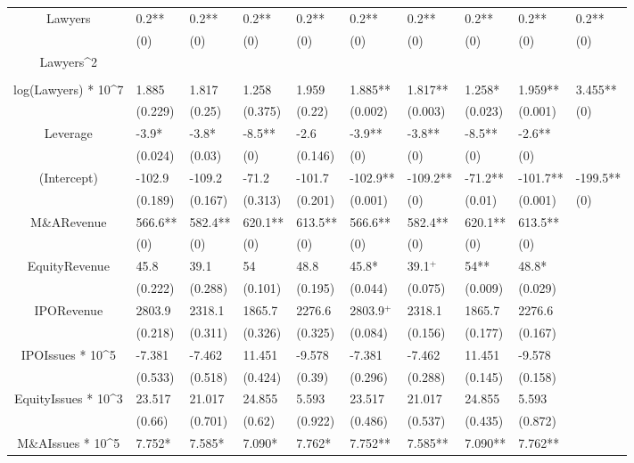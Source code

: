 \documentclass{article}
\begin{document}
\begin{table}[H]
\begin{tabular}{|clllllllll|}
Lawyers & 0.2** & 0.2** & 0.2** & 0.2** & 0.2** & 0.2** & 0.2** & 0.2** & 0.2** \\ 
   & (0) & (0) & (0) & (0) & (0) & (0) & (0) & (0) & (0) \\ 
  Lawyers^2 &  &  &  &  &  &  &  &  &  \\ 
   &  &  &  &  &  &  &  &  &  \\ 
  log(Lawyers) * 10^7 & 1.885 & 1.817 & 1.258 & 1.959 & 1.885** & 1.817** & 1.258* & 1.959** & 3.455** \\ 
   & (0.229) & (0.25) & (0.375) & (0.22) & (0.002) & (0.003) & (0.023) & (0.001) & (0) \\ 
  Leverage & -3.9* & -3.8* & -8.5** & -2.6 & -3.9** & -3.8** & -8.5** & -2.6** &  \\ 
   & (0.024) & (0.03) & (0) & (0.146) & (0) & (0) & (0) & (0) &  \\ 
  (Intercept) & -102.9 & -109.2 & -71.2 & -101.7 & -102.9** & -109.2** & -71.2** & -101.7** & -199.5** \\ 
   & (0.189) & (0.167) & (0.313) & (0.201) & (0.001) & (0) & (0.01) & (0.001) & (0) \\ 
  M\&ARevenue & 566.6** & 582.4** & 620.1** & 613.5** & 566.6** & 582.4** & 620.1** & 613.5** &  \\ 
   & (0) & (0) & (0) & (0) & (0) & (0) & (0) & (0) &  \\ 
  EquityRevenue & 45.8 & 39.1 & 54 & 48.8 & 45.8* & 39.1$^{+}$ & 54** & 48.8* &  \\ 
   & (0.222) & (0.288) & (0.101) & (0.195) & (0.044) & (0.075) & (0.009) & (0.029) &  \\ 
  IPORevenue & 2803.9 & 2318.1 & 1865.7 & 2276.6 & 2803.9$^{+}$ & 2318.1 & 1865.7 & 2276.6 &  \\ 
   & (0.218) & (0.311) & (0.326) & (0.325) & (0.084) & (0.156) & (0.177) & (0.167) &  \\ 
  IPOIssues * 10^5 & -7.381 & -7.462 & 11.451 & -9.578 & -7.381 & -7.462 & 11.451 & -9.578 &  \\ 
   & (0.533) & (0.518) & (0.424) & (0.39) & (0.296) & (0.288) & (0.145) & (0.158) &  \\ 
  EquityIssues * 10^3 & 23.517 & 21.017 & 24.855 & 5.593 & 23.517 & 21.017 & 24.855 & 5.593 &  \\ 
   & (0.66) & (0.701) & (0.62) & (0.922) & (0.486) & (0.537) & (0.435) & (0.872) &  \\ 
  M\&AIssues * 10^5 & 7.752* & 7.585* & 7.090* & 7.762* & 7.752** & 7.585** & 7.090** & 7.762** &  \\ 

\end{tabular}
\end{table}
\end{document}
